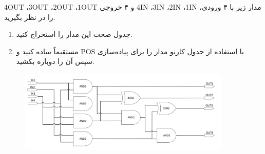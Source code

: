 مدار زیر با ۴ ورودی، \( \text{1IN} \)، \( \text{2IN} \)، \( \text{3IN} \)، \( \text{4IN} \) و ۴ خروجی \( \text{1OUT} \)، \( \text{2OUT} \)، \( \text{3OUT} \)، \( \text{4OUT} \) را در نظر بگیرید.

\begin{enumerate}
	\item 
	جدول صحت این مدار را استخراج کنید.
	
	\item 
	با استفاده از جدول کارنو مدار را برای پیاده‌سازی \( \text{POS} \) مستقیماً ساده کنید و سپس آن را دوباره بکشید.
\end{enumerate}



\begin{figure}[h]
	\centering
	\includegraphics[width=0.9\textwidth]{fig/img2.png}
	\label{img2}
\end{figure}